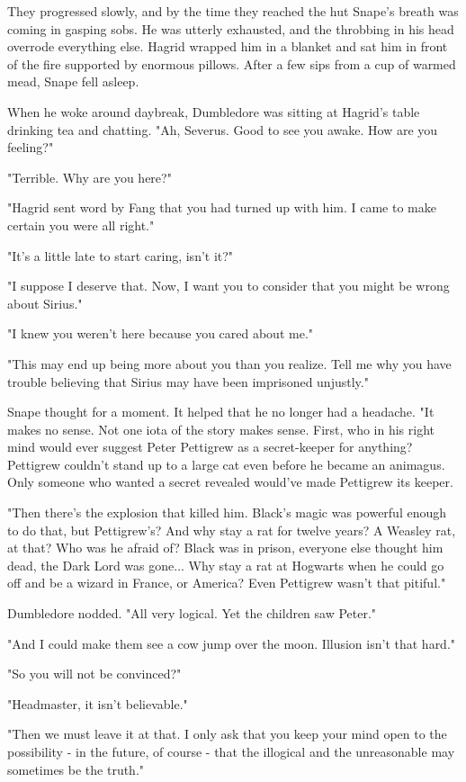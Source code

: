 \documentclass[a4paper,11pt]{article}
\begin{document}
They progressed slowly, and by the time they reached the hut Snape's breath was coming in gasping sobs. He was utterly exhausted, and the throbbing in his head overrode everything else. Hagrid wrapped him in a blanket and sat him in front of the fire supported by enormous pillows. After a few sips from a cup of warmed mead, Snape fell asleep.

When he woke around daybreak, Dumbledore was sitting at Hagrid's table drinking tea and chatting. "Ah, Severus. Good to see you awake. How are you feeling?"

"Terrible. Why are you here?"

"Hagrid sent word by Fang that you had turned up with him. I came to make certain you were all right."

"It's a little late to start caring, isn't it?"

"I suppose I deserve that. Now, I want you to consider that you might be wrong about Sirius."

"I knew you weren't here because you cared about me."

"This may end up being more about you than you realize. Tell me why you have trouble believing that Sirius may have been imprisoned unjustly."

Snape thought for a moment. It helped that he no longer had a headache. "It makes no sense. Not one iota of the story makes sense. First, who in his right mind would ever suggest Peter Pettigrew as a secret-keeper for anything? Pettigrew couldn't stand up to a large cat even before he became an animagus. Only someone who wanted a secret revealed would've made Pettigrew its keeper.

"Then there's the explosion that killed him. Black's magic was powerful enough to do that, but Pettigrew's? And why stay a rat for twelve years? A Weasley rat, at that? Who was he afraid of? Black was in prison, everyone else thought him dead, the Dark Lord was gone... Why stay a rat at Hogwarts when he could go off and be a wizard in France, or America? Even Pettigrew wasn't that pitiful."

Dumbledore nodded. "All very logical. Yet the children saw Peter."

"And I could make them see a cow jump over the moon. Illusion isn't that hard."

"So you will not be convinced?"

"Headmaster, it isn't believable."

"Then we must leave it at that. I only ask that you keep your mind open to the possibility - in the future, of course - that the illogical and the unreasonable may sometimes be the truth."
\end{document}
